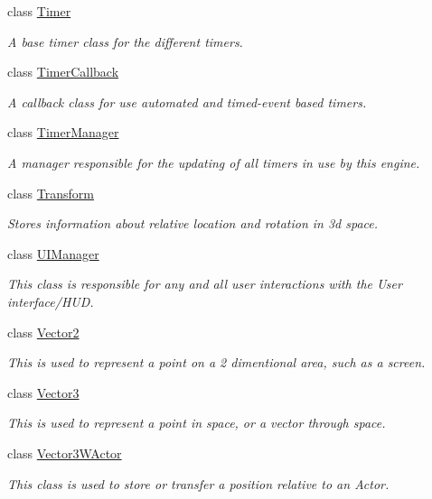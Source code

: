 \begin{DoxyCompactItemize}
class \hyperlink{classMezzanine_1_1Timer}{Timer}
\begin{DoxyCompactList}\small\item\em A base timer class for the different timers. \end{DoxyCompactList}\item 
class \hyperlink{classMezzanine_1_1TimerCallback}{Timer\-Callback}
\begin{DoxyCompactList}\small\item\em A callback class for use automated and timed-\/event based timers. \end{DoxyCompactList}\item 
class \hyperlink{classMezzanine_1_1TimerManager}{Timer\-Manager}
\begin{DoxyCompactList}\small\item\em A manager responsible for the updating of all timers in use by this engine. \end{DoxyCompactList}\item 
class \hyperlink{classMezzanine_1_1Transform}{Transform}
\begin{DoxyCompactList}\small\item\em Stores information about relative location and rotation in 3d space. \end{DoxyCompactList}\item 
class \hyperlink{classMezzanine_1_1UIManager}{U\-I\-Manager}
\begin{DoxyCompactList}\small\item\em This class is responsible for any and all user interactions with the User interface/\-H\-U\-D. \end{DoxyCompactList}\item 
class \hyperlink{classMezzanine_1_1Vector2}{Vector2}
\begin{DoxyCompactList}\small\item\em This is used to represent a point on a 2 dimentional area, such as a screen. \end{DoxyCompactList}\item 
class \hyperlink{classMezzanine_1_1Vector3}{Vector3}
\begin{DoxyCompactList}\small\item\em This is used to represent a point in space, or a vector through space. \end{DoxyCompactList}\item 
class \hyperlink{classMezzanine_1_1Vector3WActor}{Vector3\-W\-Actor}
\begin{DoxyCompactList}\small\item\em This class is used to store or transfer a position relative to an Actor. \end{DoxyCompactList}\item 

\end{DoxyCompactItemize}
